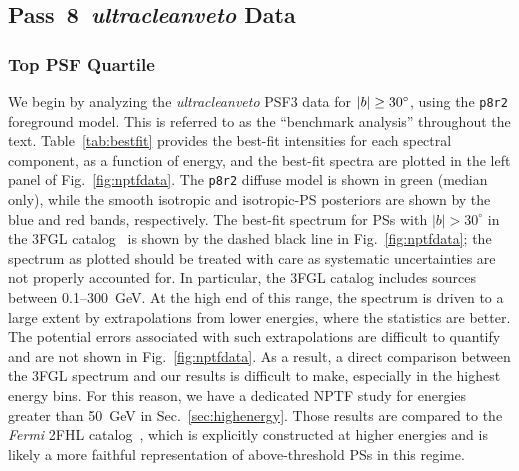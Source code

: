 \subsection{ Pass~8~{\it ultracleanveto} Data}
\label{sec:benchmark}

\subsubsection{Top PSF Quartile}

We begin by analyzing the {\it ultracleanveto} PSF3 data for $\left\lvert b \right\rvert \geq 30^\circ$, using the \texttt{p8r2} foreground model.  This is referred to as the ``benchmark analysis'' throughout the text.  Table~\ref{tab:bestfit} provides the best-fit intensities for each spectral component, as a function of energy, and the best-fit spectra are plotted in the left panel of Fig.~\ref{fig:nptfdata}.   The \texttt{p8r2} diffuse model is shown in green (median only), while the smooth isotropic and isotropic-PS posteriors are shown by the blue and red bands, respectively.  The best-fit spectrum for PSs with $|b| > 30^\circ$ in the 3FGL catalog~\cite{Acero:2015hja} is shown by the dashed black line in Fig.~\ref{fig:nptfdata}; the spectrum as plotted should be treated with care as systematic uncertainties are not properly accounted for.  In particular, the 3FGL catalog includes sources between 0.1--300~GeV.  At the high end of this range, the spectrum is driven to a large extent by extrapolations from lower energies, where the statistics are better.  The potential errors associated with such extrapolations are difficult to quantify and are not shown in Fig.~\ref{fig:nptfdata}.    
As a result, a direct comparison between the 3FGL spectrum and our results is difficult to make, especially in the highest energy bins.  For this reason, we have a dedicated NPTF study for energies greater than 50~GeV in Sec.~\ref{sec:highenergy}.  Those results are compared to the \emph{Fermi} 2FHL catalog~\cite{TheFermi-LAT:2015ykq}, which is explicitly constructed at higher energies and is likely a more faithful representation of above-threshold PSs in this regime.    


